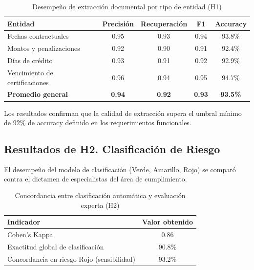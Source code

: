 \documentclass[12pt]{article}
\begin{document}
\begin{table}[htbp]
\centering
\caption{Desempeño de extracción documental por tipo de entidad (H1)}
\vspace{0.3cm}
\label{tab:resultados-h1-extraccion}
\begin{tabularx}{\textwidth}{|>{\raggedright\arraybackslash}X|c|c|c|c|}
\hline
\textbf{Entidad} & \textbf{Precisión} & \textbf{Recuperación} & \textbf{F1} & \textbf{Accuracy} \\
\hline
Fechas contractuales & 0.95 & 0.93 & 0.94 & 93.8\% \\
\hline
Montos y penalizaciones & 0.92 & 0.90 & 0.91 & 92.4\% \\
\hline
Días de crédito & 0.93 & 0.91 & 0.92 & 92.9\% \\
\hline
Vencimiento de certificaciones & 0.96 & 0.94 & 0.95 & 94.7\% \\
\hline
\textbf{Promedio general} & \textbf{0.94} & \textbf{0.92} & \textbf{0.93} & \textbf{93.5\%} \\
\hline
\end{tabularx}
\end{table}

Los resultados confirman que la calidad de extracción supera el umbral mínimo de 92\% de accuracy definido en los requerimientos funcionales.

\subsection{Resultados de H2. Clasificación de Riesgo}

El desempeño del modelo de clasificación (Verde, Amarillo, Rojo) se comparó contra el dictamen de especialistas del área de cumplimiento.

\begin{table}[htbp]
\centering
\caption{Concordancia entre clasificación automática y evaluación experta (H2)}
\vspace{0.3cm}
\label{tab:resultados-h2-kappa}
\begin{tabularx}{\textwidth}{|>{\raggedright\arraybackslash}X|c|}
\hline
\textbf{Indicador} & \textbf{Valor obtenido} \\
\hline
Cohen's Kappa & 0.86 \\
\hline
Exactitud global de clasificación & 90.8\% \\
\hline
Concordancia en riesgo Rojo (sensibilidad) & 93.2\% \\
\hline
\end{tabularx}
\end{table}
\end{document}
